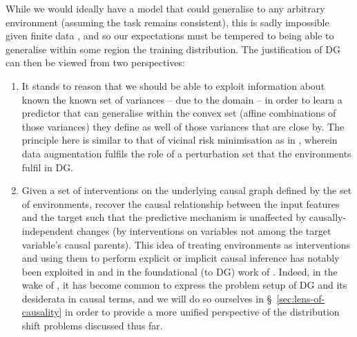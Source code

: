 %
While we would ideally have a model that could generalise to any arbitrary environment (assuming
the task remains consistent), this is sadly impossible given finite data
\cite{david2010impossibility}, and so our expectations must be tempered to being able to generalise
within some region the training distribution.
%
The justification of DG can then be viewed from two perspectives: 
\begin{enumerate}
%
    \item 
%
        It stands to reason that we should be able to exploit information about known the known set
        of variances -- due to the domain -- in order to learn a predictor that can generalise
        within the convex set (affine combinations of those variances) they define as well of those
        variances that are close by.
%
        The principle here is similar to that of vicinal risk minimisation
        \citep{chapelle2000vicinal} as in \cite{zhang2017mixup}, wherein data augmentation fulfils
        the role of a perturbation set that the environments fulfil in DG.
%
    \item
        Given a set of interventions on the underlying causal graph defined by the set of
        environments, recover the causal relationship between the input features and the target
        such that the predictive mechanism is unaffected by causally-independent changes (by
        interventions on variables not among the target variable's causal parents).
%
        This idea of treating environments as interventions and using them to perform explicit or
        implicit causal inference has notably been exploited in \cite{peters2016causal} and in the
        foundational (to DG) work of \cite{arjovsky2019invariant}.
%
        Indeed, in the wake of \cite{arjovsky2019invariant}, it has become common \citep{
        gulrajani2020search, krueger2021out, mahajan2021domain, lin2022zin} to express the problem
        setup of DG and its desiderata in causal terms, and we will do so ourselves in
        \S~\ref{sec:lens-of-causality} in order to provide a more unified perspective of the
        distribution shift problems discussed thus far.
%
\end{enumerate}

